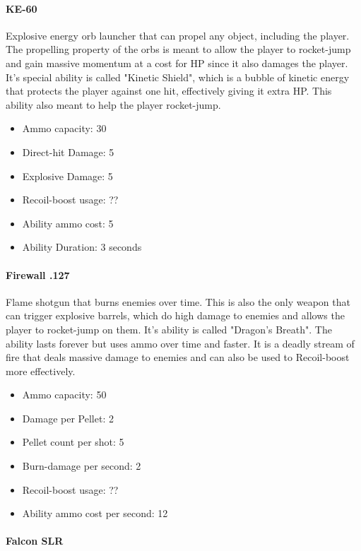 \documentclass[12pt]{article}
\begin{document}
\paragraph{KE-60}

Explosive energy orb launcher that can propel any object, including the player. The propelling property of the orbs is meant to allow the player to rocket-jump and gain massive momentum at a cost for HP since it also damages the player. It's special ability is called "Kinetic Shield", which is a bubble of kinetic energy that protects the player against one hit, effectively giving it extra HP. This ability also meant to help the player rocket-jump. 

\begin{itemize}
	\item Ammo capacity: 30
	\item Direct-hit Damage: 5
	\item Explosive Damage: 5
	\item Recoil-boost usage: ??
	\item Ability ammo cost: 5
	\item Ability Duration: 3 seconds
\end{itemize} 


\paragraph{Firewall .127}

Flame shotgun that burns enemies over time. This is also the only weapon that can trigger explosive barrels, which do high damage to enemies and allows the player to rocket-jump on them. It's ability is called "Dragon's Breath". The ability lasts forever but uses ammo over time and faster. It is a deadly stream of fire that deals massive damage to enemies and can also be used to Recoil-boost more effectively.

\begin{itemize}
	\item Ammo capacity: 50
	\item Damage per Pellet: 2
	\item Pellet count per shot: 5
	\item Burn-damage per second: 2
	\item Recoil-boost usage: ??
	\item Ability ammo cost per second: 12
\end{itemize} 

\paragraph{Falcon SLR}
\end{document}
